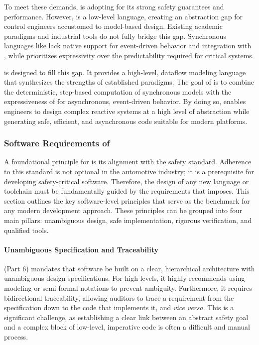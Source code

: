To meet these demands, \ampere is adopting \Rust for its strong safety guarantees and
performance. However, \Rust is a low-level language, creating an abstraction gap for
control engineers accustomed to model-based design. Existing academic paradigms and
industrial tools do not fully bridge this gap. Synchronous languages like \Lustre lack
native support for event-driven behavior and integration with \Rust, while \frp
prioritizes expressivity over the predictability required for critical systems.

\GRust is designed to fill this gap. It provides a high-level, dataflow modeling
language that synthesizes the strengths of established paradigms. The goal of \GRust is
to combine the deterministic, step-based computation of synchronous models with the
expressiveness of \frp for asynchronous, event-driven behavior. By doing so, \GRust
enables engineers to design complex reactive systems at a high level of abstraction
while generating safe, efficient, and asynchronous \Rust code suitable for modern \sdv
platforms.

\subsubsection{Software Requirements of \iso}
\label{sec:grust:implem:design_principles:iso}

A foundational principle for \GRust is its alignment with the \iso safety standard.
Adherence to this standard is not optional in the automotive industry; it is a
prerequisite for developing safety-critical software. Therefore, the design of any new
language or toolchain must be fundamentally guided by the requirements that \iso imposes.
This section outlines the key software-level principles that serve as the benchmark for
any modern development approach. These principles can be grouped into four main pillars:
unambiguous design, safe implementation, rigorous verification, and qualified tools.

\paragraph{Unambiguous Specification and Traceability}
\iso (Part 6) mandates that software be built on a clear, hierarchical architecture with
unambiguous design specifications. For high \Asil levels, it highly recommends using
modeling or semi-formal notations to prevent ambiguity. Furthermore, it requires
bidirectional traceability, allowing auditors to trace a requirement from the
specification down to the code that implements it, and \emph{vice versa}. This is a significant
challenge, as establishing a clear link between an abstract safety goal and a complex
block of low-level, imperative code is often a difficult and manual process.


